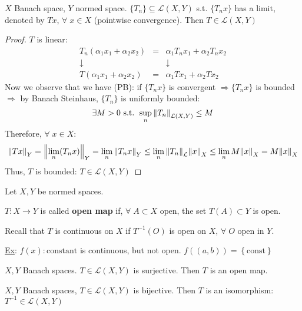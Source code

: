 \begin{corollary}
    \(X\) Banach space, \(Y\) normed space. \(\{ T_n \} \subseteq \mathcal{L}(X, Y)\) s.t. \(\{T_n x\}\) has a limit, denoted by \(Tx\), \(\forall \; x \in X\) (pointwise convergence). 
    Then \(T \in \mathcal{L}(X, Y)\)
\end{corollary}
\begin{proof}
    \(T\) is linear: 
    \[
        \begin{array}{ccc}
            T_n(\alpha_1 x_1 + \alpha_2 x_2 ) & = & \alpha_1 T_n x_1 + \alpha_2 T_n x_2 \\
            \downarrow && \downarrow \\
            T(\alpha_1 x_1 + \alpha_2 x_2) & = & \alpha_1 Tx_1 + \alpha_2 Tx_2
        \end{array}
    \]
    Now we observe that we have (PB): if \(\{ T_n x \}\) is convergent \(\Rightarrow \{T_n x\} \) is bounded \(\Rightarrow \) by Banach Steinhaus, \(\{ T_n \}\) is uniformly bounded: 
    \[
        \exists M>0 \text{ s.t. } \sup_n \norm{T_n}_{\mathcal{L}(X, Y)} \leq M 
    \]
    Therefore, \(\forall \; x \in X\):
    \[
        \norm{Tx}_Y = \norm{\lim_n (T_n x)}_Y = \lim_n \norm{T_n x}_Y \leq \lim_n \norm{T_n}_\mathcal{L} \norm{x}_X \leq \lim_n M \norm{x}_X  = M \norm{x}_X
    \]
    Thus, \(T\) is bounded: \(T \in \mathcal{L}(X, Y)\)
\end{proof}
Let \(X, Y\) be normed spaces.
\begin{definition}
    \(T: X \to Y\) is called \textbf{open map} if, \(\forall \; A \subset X \mbox{ open}\), the set \(T(A)\subset Y\) is open.
\end{definition}
\begin{remark}
    Recall that \(T\) is continuous on \(X\) if \(T^{-1}(O)\) is open on \(X\), \(\forall \; O \mbox{ open in } Y\).
\end{remark}
\noindent\underline{Ex}: \(f(x) : \mbox{constant}\) is continuous, but not open. \(f((a,b)) = \left\{ \mbox{const} \right\}\)
\begin{theorem}
    \(X, Y\) Banach spaces. \(T \in \mathcal{L}(X,Y)\) is surjective. Then \(T\) is an open map.
\end{theorem}
\begin{corollary}
    \(X,Y\) Banach spaces, \(T \in \mathcal{L}(X,Y)\) is bijective. Then \(T\) is an isomorphism: \(T^{-1} \in \mathcal{L}(X,Y)\)
\end{corollary}
